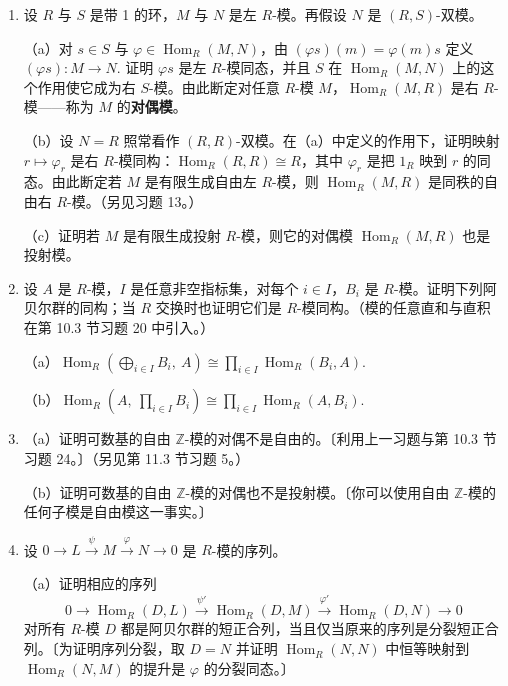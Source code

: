 \begin{enumerate}
（c）由此断定若 \(N\) 是自由（相应地，投射、内射、平坦）左 \(R\)-模，则 \(\operatorname{Hom}_R(R, N)\) 也是自由（相应地，投射、内射、平坦）左 \(R\)-模。

\item 设 \(R\) 与 \(S\) 是带 1 的环，\(M\) 与 \(N\) 是左 \(R\)-模。再假设 \(N\) 是 \((R, S)\)-双模。

（a）对 \(s \in S\) 与 \(\varphi \in \operatorname{Hom}_R(M, N)\)，由 \((\varphi s)(m) = \varphi(m)s\) 定义 \((\varphi s) : M \to N\). 证明 \(\varphi s\) 是左 \(R\)-模同态，并且 \(S\) 在 \(\operatorname{Hom}_R(M, N)\) 上的这个作用使它成为右 \(S\)-模。由此断定对任意 \(R\)-模 \(M\)，\(\operatorname{Hom}_R(M, R)\) 是右 \(R\)-模——称为 \(M\) 的\textbf{对偶模}。

（b）设 \(N = R\) 照常看作 \((R, R)\)-双模。在（a）中定义的作用下，证明映射 \(r \mapsto \varphi_r\) 是右 \(R\)-模同构：\(\operatorname{Hom}_R(R, R) \cong R\)，其中 \(\varphi_r\) 是把 \(1_R\) 映到 \(r\) 的同态。由此断定若 \(M\) 是有限生成自由左 \(R\)-模，则 \(\operatorname{Hom}_R(M, R)\) 是同秩的自由右 \(R\)-模。（另见习题 13。）

（c）证明若 \(M\) 是有限生成投射 \(R\)-模，则它的对偶模 \(\operatorname{Hom}_R(M, R)\) 也是投射模。

\item 设 \(A\) 是 \(R\)-模，\(I\) 是任意非空指标集，对每个 \(i \in I\)，\(B_i\) 是 \(R\)-模。证明下列阿贝尔群的同构；当 \(R\) 交换时也证明它们是 \(R\)-模同构。（模的任意直和与直积在第 10.3 节习题 20 中引入。）

（a）\(\operatorname{Hom}_R\left(\bigoplus_{i \in I} B_i,\ A\right) \cong \prod_{i \in I}\operatorname{Hom}_R(B_i, A)\).

（b）\(\operatorname{Hom}_R\left(A,\ \prod_{i \in I} B_i\right) \cong \prod_{i \in I}\operatorname{Hom}_R(A, B_i)\).

\item （a）证明可数基的自由 \(\mathbb{Z}\)-模的对偶不是自由的。〔利用上一习题与第 10.3 节习题 24。〕（另见第 11.3 节习题 5。）

（b）证明可数基的自由 \(\mathbb{Z}\)-模的对偶也不是投射模。〔你可以使用自由 \(\mathbb{Z}\)-模的任何子模是自由模这一事实。〕

\item 设 \(0 \to L \xrightarrow{\psi} M \xrightarrow{\varphi} N \to 0\) 是 \(R\)-模的序列。

（a）证明相应的序列
\[
0 \longrightarrow \operatorname{Hom}_R(D, L) \xrightarrow{\ \psi'\ } \operatorname{Hom}_R(D, M) \xrightarrow{\ \varphi'\ } \operatorname{Hom}_R(D, N) \longrightarrow 0
\]
对所有 \(R\)-模 \(D\) 都是阿贝尔群的短正合列，当且仅当原来的序列是分裂短正合列。〔为证明序列分裂，取 \(D = N\) 并证明 \(\operatorname{Hom}_R(N, N)\) 中恒等映射到 \(\operatorname{Hom}_R(N, M)\) 的提升是 \(\varphi\) 的分裂同态。〕


\end{enumerate}
